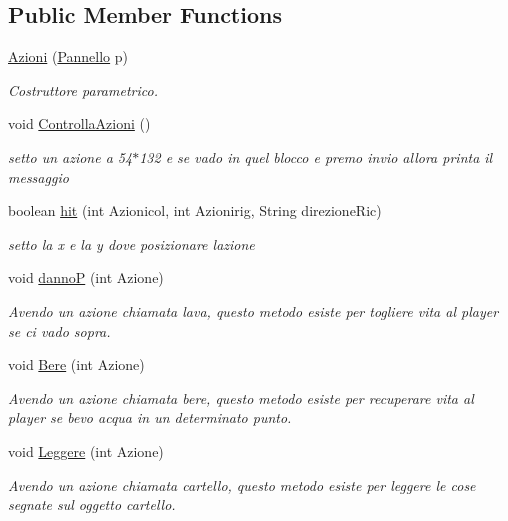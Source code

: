 \subsection*{Public Member Functions}
\begin{DoxyCompactItemize}
\item 
\hyperlink{classa_1_1survival_1_1game_1_1_azioni_af521149b5bbecac98d09d33772e4bfd2}{Azioni} (\hyperlink{classa_1_1survival_1_1game_1_1_pannello}{Pannello} p)
\begin{DoxyCompactList}\small\item\em Costruttore parametrico. \end{DoxyCompactList}\item 
void \hyperlink{classa_1_1survival_1_1game_1_1_azioni_a39753d0160b9846cd1dd3d4556519456}{Controlla\+Azioni} ()
\begin{DoxyCompactList}\small\item\em setto un azione a 54$\ast$132 e se vado in quel blocco e premo invio allora printa il messaggio \end{DoxyCompactList}\item 
boolean \hyperlink{classa_1_1survival_1_1game_1_1_azioni_aa8b8a425d9f7a22d14cf64d6d0263927}{hit} (int Azionicol, int Azionirig, String direzione\+Ric)
\begin{DoxyCompactList}\small\item\em setto la x e la y dove posizionare l\textquotesingle{}azione \end{DoxyCompactList}\item 
void \hyperlink{classa_1_1survival_1_1game_1_1_azioni_ac1ebef3669e998cab686d462e5bdea24}{dannoP} (int Azione)
\begin{DoxyCompactList}\small\item\em Avendo un azione chiamata lava, questo metodo esiste per togliere vita al player se ci vado sopra. \end{DoxyCompactList}\item 
void \hyperlink{classa_1_1survival_1_1game_1_1_azioni_af6157da89a39a95e583e0bffc2da471d}{Bere} (int Azione)
\begin{DoxyCompactList}\small\item\em Avendo un azione chiamata bere, questo metodo esiste per recuperare vita al player se bevo acqua in un determinato punto. \end{DoxyCompactList}\item 
void \hyperlink{classa_1_1survival_1_1game_1_1_azioni_a9ca19225b144750b819e59fece5ef1a7}{Leggere} (int Azione)
\begin{DoxyCompactList}\small\item\em Avendo un azione chiamata cartello, questo metodo esiste per leggere le cose segnate sul oggetto cartello. \end{DoxyCompactList}\end{DoxyCompactItemize}


